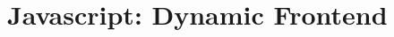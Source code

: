 \chapter{Javascript: Dynamic Frontend}\label{ch:javascript-dynamic-frontend}

\setimgdir
\minitoc






